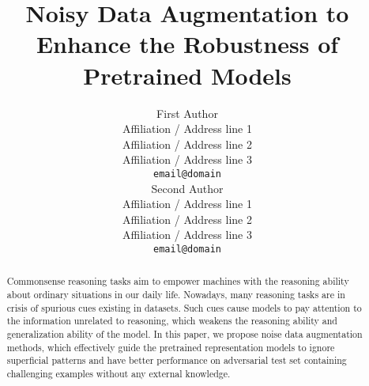 \documentclass[11pt]{article}
\title{Noisy Data Augmentation to Enhance the Robustness of Pretrained Models}
\author{First Author \\
  Affiliation / Address line 1 \\
  Affiliation / Address line 2 \\
  Affiliation / Address line 3 \\
  {\tt email@domain} \\\And
  Second Author \\
  Affiliation / Address line 1 \\
  Affiliation / Address line 2 \\
  Affiliation / Address line 3 \\
  {\tt email@domain} \\}
\date{}
\newcommand{\YZ}[1]{\textcolor{red}{Yizhu: #1}}
\begin{document}
\maketitle
\begin{abstract}
Commonsense reasoning tasks aim to 
empower machines with the reasoning ability 
about ordinary situations in
our daily life. Nowadays, many reasoning tasks 
are in crisis of spurious cues existing in datasets.
Such cues cause 
models to pay attention to the information unrelated to reasoning, 
which weakens the reasoning ability and generalization ability of the model.
In this paper, we propose
noise data augmentation methods, 
which effectively guide the 
pretrained representation models to ignore superficial patterns and  
have better performance on adversarial test set containing challenging examples 
without any external knowledge.
\end{abstract}

	
	
	
	


 
\end{document}
